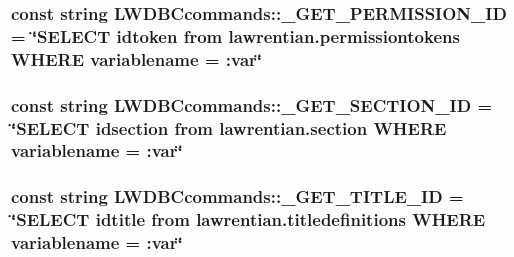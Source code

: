 \subsubsection[{\+\_\+\+G\+E\+T\+\_\+\+P\+E\+R\+M\+I\+S\+S\+I\+O\+N\+\_\+\+I\+D}]{\setlength{\rightskip}{0pt plus 5cm}const string L\+W\+D\+B\+Ccommands\+::\+\_\+\+G\+E\+T\+\_\+\+P\+E\+R\+M\+I\+S\+S\+I\+O\+N\+\_\+\+I\+D = \char`\"{}S\+E\+L\+E\+C\+T idtoken from lawrentian.\+permissiontokens W\+H\+E\+R\+E variablename = \+:var\char`\"{}}\label{namespace_l_w_d_b_ccommands_aa6c28877fcb0b957733838a203649cd4}
\hypertarget{namespace_l_w_d_b_ccommands_ada31170d76bb541174b8c40d8d019cca}{}
\subsubsection[{\+\_\+\+G\+E\+T\+\_\+\+S\+E\+C\+T\+I\+O\+N\+\_\+\+I\+D}]{\setlength{\rightskip}{0pt plus 5cm}const string L\+W\+D\+B\+Ccommands\+::\+\_\+\+G\+E\+T\+\_\+\+S\+E\+C\+T\+I\+O\+N\+\_\+\+I\+D = \char`\"{}S\+E\+L\+E\+C\+T idsection from lawrentian.\+section W\+H\+E\+R\+E variablename = \+:var\char`\"{}}\label{namespace_l_w_d_b_ccommands_ada31170d76bb541174b8c40d8d019cca}
\hypertarget{namespace_l_w_d_b_ccommands_a2b95e41044f72b14f707b30773f2ece5}{}
\subsubsection[{\+\_\+\+G\+E\+T\+\_\+\+T\+I\+T\+L\+E\+\_\+\+I\+D}]{\setlength{\rightskip}{0pt plus 5cm}const string L\+W\+D\+B\+Ccommands\+::\+\_\+\+G\+E\+T\+\_\+\+T\+I\+T\+L\+E\+\_\+\+I\+D = \char`\"{}S\+E\+L\+E\+C\+T idtitle from lawrentian.\+titledefinitions W\+H\+E\+R\+E variablename = \+:var\char`\"{}}\label{namespace_l_w_d_b_ccommands_a2b95e41044f72b14f707b30773f2ece5}
\hypertarget{namespace_l_w_d_b_ccommands_a9b4deb87585d30ea401b83064fa5519b}{}

